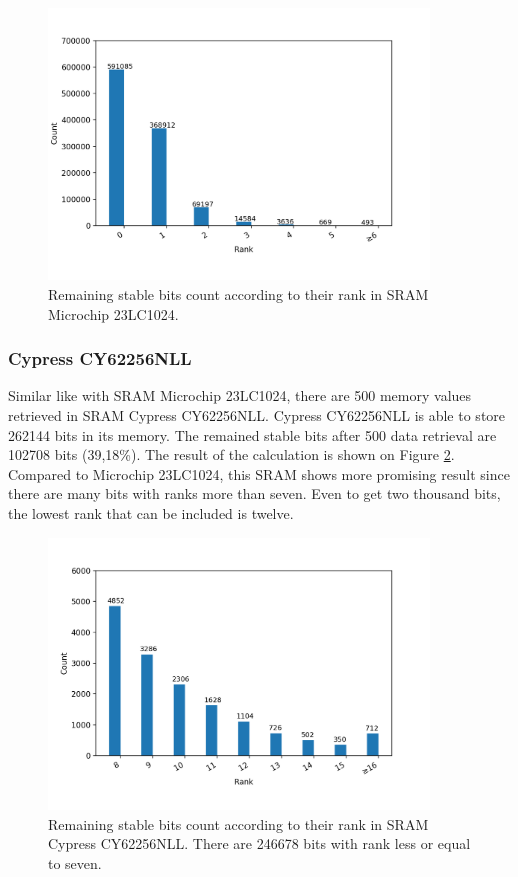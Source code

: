 \begin{figure}[tph!]
    \centerline{\includegraphics[width={0.9\textwidth}]{images/23lc1024_score_rank_bits}}
    \caption{Remaining stable bits count according to their rank in SRAM Microchip 23LC1024.}
    \label{fig:23lc1024_score_rank_bits}
\end{figure}

\subsubsection{Cypress CY62256NLL}
Similar like with SRAM Microchip 23LC1024, there are 500 memory values retrieved in SRAM Cypress CY62256NLL.
Cypress CY62256NLL is able to store 262144 bits in its memory. The remained stable bits after 500 data retrieval are 102708 bits (39,18\%).
The result of the calculation is shown on Figure \ref{fig:cy62256nll_score_rank_bits}. Compared to Microchip 23LC1024, this SRAM shows more promising result since there are many bits with ranks more than seven. Even to get two thousand bits, the lowest rank that can be included is twelve.

\begin{figure}[tph!]
    \centerline{\includegraphics[width={0.9\textwidth}]{images/cy62256nll_score_rank_bits}}
    \caption{Remaining stable bits count according to their rank in SRAM Cypress CY62256NLL. There are 246678 bits with rank less or equal to seven.}
    \label{fig:cy62256nll_score_rank_bits}
\end{figure}

